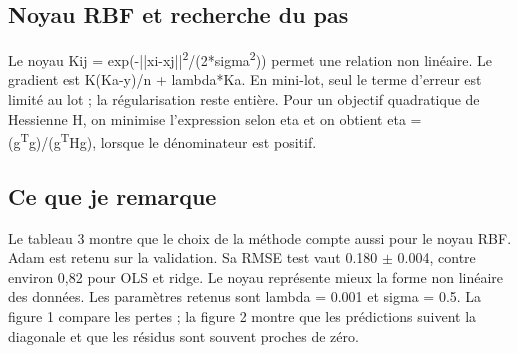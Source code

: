 \documentclass[10pt,a4paper]{article}
\begin{document}
\subsection*{Noyau RBF et recherche du pas}
Le noyau Kij = exp(-||xi-xj||\textsuperscript{2}/(2*sigma\textsuperscript{2})) permet une relation non linéaire. Le gradient est K(Ka-y)/n + lambda*Ka. En mini-lot, seul le terme d’erreur est limité au lot ; la régularisation reste entière. Pour un objectif quadratique de Hessienne H, on minimise l’expression selon eta et on obtient eta = (g\textsuperscript{T}g)/(g\textsuperscript{T}Hg), lorsque le dénominateur est positif.

\subsection*{Ce que je remarque}
Le tableau 3 montre que le choix de la méthode compte aussi pour le noyau RBF. Adam est retenu sur la validation. Sa RMSE test vaut 0.180 $\pm$ 0.004, contre environ 0,82 pour OLS et ridge. Le noyau représente mieux la forme non linéaire des données. Les paramètres retenus sont lambda = 0.001 et sigma = 0.5. La figure 1 compare les pertes ; la figure 2 montre que les prédictions suivent la diagonale et que les résidus sont souvent proches de zéro.
\end{document}
